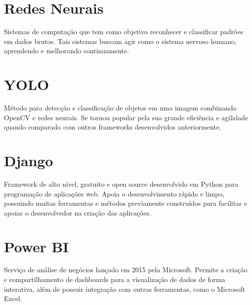 \section{Redes Neurais}
\indent
\par Sistemas de computação que tem como objetivo reconhecer e classificar padrões em dados brutos. Tais sistemas buscam agir como o sistema nervoso humano, aprendendo e melhorando continuamente.

\section{YOLO}
\indent
\par Método para detecção e classificação de objetos em uma imagem combinando OpenCV e redes neurais. Se tornou popular pela sua grande eficiência e agilidade quando comparado com outros frameworks desenvolvidos anteriormente.

\section{Django}
\indent
\par Framework de alto nível, gratuito e open source desenvolvido em Python para programação de aplicações web. Apoia o desenvolvimento rápido e limpo, possuindo muitas ferramentas e métodos previamente construídos para facilitar e apoiar o desenvolvedor na criação das aplicações.

\section{Power BI}
\indent
\par Serviço de análise de negócios lançado em 2015 pela Microsoft. Permite a criação e compartilhamento de dashboards para a visualização de dados de forma interativa, além de possuir integração com outras ferramentas, como o Microsoft Excel.


